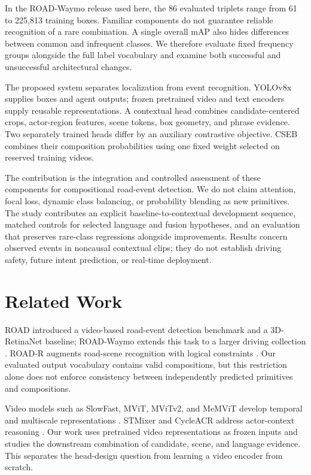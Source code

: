 \documentclass[11pt,letterpaper]{article}
\begin{document}
In the ROAD-Waymo release used here, the 86 evaluated triplets range from 61 to 225,813 training boxes. Familiar components do not guarantee reliable recognition of a rare combination. A single overall mAP also hides differences between common and infrequent classes. We therefore evaluate fixed frequency groups alongside the full label vocabulary and examine both successful and unsuccessful architectural changes.

The proposed system separates localization from event recognition. YOLOv8x supplies boxes and agent outputs; frozen pretrained video and text encoders supply reusable representations. A contextual head combines candidate-centered crops, actor-region features, scene tokens, box geometry, and phrase evidence. Two separately trained heads differ by an auxiliary contrastive objective. CSEB combines their composition probabilities using one fixed weight selected on reserved training videos.

The contribution is the integration and controlled assessment of these components for compositional road-event detection. We do not claim attention, focal loss, dynamic class balancing, or probability blending as new primitives. The study contributes an explicit baseline-to-contextual development sequence, matched controls for selected language and fusion hypotheses, and an evaluation that preserves rare-class regressions alongside improvements. Results concern observed events in noncausal contextual clips; they do not establish driving safety, future intent prediction, or real-time deployment.

\section{Related Work}
ROAD introduced a video-based road-event detection benchmark and a 3D-RetinaNet baseline; ROAD-Waymo extends this task to a larger driving collection \cite{road,road-waymo}. ROAD-R augments road-scene recognition with logical constraints \cite{road-r}. Our evaluated output vocabulary contains valid compositions, but this restriction alone does not enforce consistency between independently predicted primitives and compositions.

Video models such as SlowFast, MViT, MViTv2, and MeMViT develop temporal and multiscale representations \cite{slowfast,mvit,mvitv2,memvit}. STMixer and CycleACR address actor-context reasoning \cite{stmixer,cycleacr}. Our work uses pretrained video representations as frozen inputs and studies the downstream combination of candidate, scene, and language evidence. This separates the head-design question from learning a video encoder from scratch.
\end{document}
